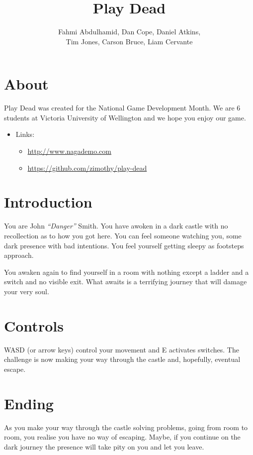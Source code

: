 \documentclass{article}
\title{Play Dead}
\author{Fahmi Abdulhamid, Dan Cope, Daniel Atkins,\\Tim Jones, Carson Bruce, Liam Cervante}
\begin{document}
 \maketitle
 
 \section{About}Play Dead was created for the National Game Development Month. We are 6 students at Victoria University of Wellington and we hope you enjoy our game.
 \begin{itemize}
  \item Links:
  \begin{itemize}
   \item \url{http://www.nagademo.com}
   \item \url{https://github.com/zimothy/play-dead}
  \end{itemize}
 \end{itemize}
 
 \section{Introduction}
 
 You are John \emph{``Danger''} Smith. You have awoken in a dark castle with no recollection as to how you got here. You can feel someone watching you, some dark presence with bad intentions. You feel yourself getting sleepy as footsteps approach.
 
 You awaken again to find yourself in a room with nothing except a ladder and a switch and no visible exit. What awaits is a terrifying journey that will damage your very soul.
 
 \section{Controls}
 
 WASD (or arrow keys) control your movement and E activates switches. The challenge is now making your way through the castle and, hopefully, eventual escape.
 
 \section{Ending}
 
 As you make your way through the castle solving problems, going from room to room, you realise you have no way of escaping. Maybe, if you continue on the dark journey the presence will take pity on you and let you leave.
\end{document}
